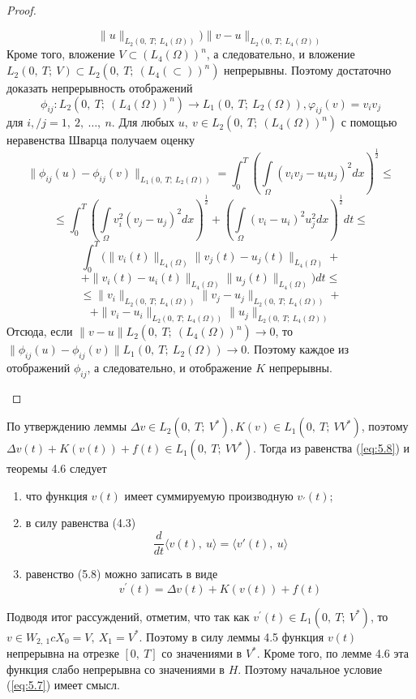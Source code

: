 \begin{proof}
\begin{enumerate}
$$        \parallel u \parallel_{L_2(0, \ T; \ L_4(\Omega))})\parallel v-u\parallel_{L_2(0, \ T; \ L_4(\Omega))}$$
        Кроме того, вложение $V \subset (L_4(\Omega))^n$, а следовательно, и вложение $L_2(0, \ T; \ V) \subset L_2(0, \ T; \ (L_4(\subset))^n)$
        непрерывны. Поэтому достаточно доказать непрерывность отображений
        $$\phi_{ij}: L_2(0, \ T; \ (L_4(\Omega))^n) \rightarrow L_1(0, \ T; \ L_2(\Omega)), \varphi_{ij}(v) = v_i v_j$$
        для $i, / j = 1, \ 2, \ \dots, \ n$.
        Для любых $u, \ v \in L_2(0, \ T; \ (L_4(\Omega))^n)$ с помощью неравенства Шварца получаем оценку
        $$\parallel\phi_{ij}(u)-\phi_{ij}(v)\parallel_{L_1(0, \ T; \ L_2(\Omega))}=\int_0^T(\int\limits_\Omega(v_iv_j-u_iu_j)^2dx)^\frac{1}{2}\le$$
        $$\le\int_0^T(\int\limits_\Omega v_i^2(v_j-u_j)^2dx)^\frac{1}{2}+(\int\limits_\Omega (v_i-u_i)^2u_j^2dx)^\frac{1}{2}dt\le$$
        $$\int_0^T(\parallel v_i(t)\parallel_{L_4(\Omega)}\parallel v_j(t)-u_j(t)\parallel_{L_4(\Omega)}+$$
        $$+\parallel v_i(t)-u_i(t)\parallel_{L_4(\Omega)}\parallel u_j(t)\parallel_{L_4(\Omega)})dt\le$$
        $$\le\parallel v_i\parallel_{L_2(0, \ T; \ L_4(\Omega))}\parallel v_j-u_j\parallel_{L_2(0, \ T; \ L_4(\Omega))}+$$
        $$+\parallel v_i-u_i\parallel_{L_2(0, \ T; \ L_4(\Omega))}\parallel u_j\parallel_{L_2(0, \ T; \ L_4(\Omega))}$$
        Отсюда, если
        $\parallel v - u \parallel L_2(0, \ T; \ (L_4(\Omega))^n) \rightarrow 0$,
        то $\parallel \phi_{ij}(u) - \phi_{ij}(v) \parallel L_1(0, \ T; \ L_2(\Omega)) \rightarrow 0$.
        Поэтому каждое из отображений $\phi_{ij}$, а следовательно, и отображение $K$ непрерывны.
    \end{enumerate}
\end{proof}

По утверждению леммы $\Delta v \in L_2(0, \ T; \ V^\ast), K(v) \in L_1(0, \ T; \ VV^\ast)$, поэтому $\Delta v(t) + K(v(t)) + f(t) \in L_1(0, \ T; \ VV^\ast)$.
Тогда из равенства (\ref{eq:5.8}) и теоремы 4.6 следует
\begin{enumerate}
    \item что функция $v(t)$ имеет суммируемую производную $v_\prime(t)$;
    \item в силу равенства (4.3)
    $$\frac{d}{dt} \langle v(t), \ u \rangle = \langle v'(t), \ u \rangle $$
    \item равенство (5.8) можно записать в виде
    $$v^\prime(t)=\Delta v(t)+K(v(t))+f(t)$$
\end{enumerate}

Подводя итог рассуждений, отметим, что так как $v^\prime(t) \in L_1(0, \ T; \ V^\ast)$, то $v \in W_{2, \ 1} c X_0 = V, \ X_1 = V^\ast$. Поэтому в силу леммы 4.5 функция
$v(t)$ непрерывна на отрезке $[0, \ T]$ со значениями в $V^\ast$. Кроме того, по лемме 4.6 эта функция слабо непрерывна со значениями в $H$. Поэтому
начальное условие (\ref{eq:5.7}) имеет смысл.

